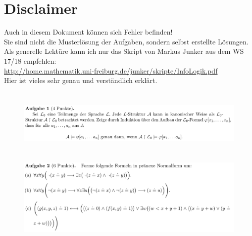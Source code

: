 \documentclass[a4paper]{scrartcl}
\begin{document}
\section*{Disclaimer}%
\label{sec:disclaimer}
Auch in diesem Dokument können sich Fehler befinden!\\
Sie sind nicht die Musterlösung der Aufgaben, sondern selbst erstellte Lösungen.\\

Als generelle Lektüre kann ich nur das Skript von Markus Junker aus dem WS 17/18 empfehlen:\\
\url{http://home.mathematik.uni-freiburg.de/junker/skripte/InfoLogik.pdf}\\
Hier ist vieles sehr genau und verständlich erklärt.

\section*{}%
\label{sec:aufgabe_1}

    \begin{figure}[H]
        \centering
        \includegraphics[scale=0.3]{./A-1.png}
        \label{fig:}
    \end{figure}



\section*{}%
\label{sec:aufgabe_2}

    \begin{figure}[H]
        \centering
        \includegraphics[scale=0.3]{./A-2.png}
        \label{fig:}
    \end{figure}
\end{document}

